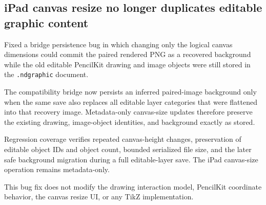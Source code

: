 \documentclass[a4paper]{article}
\title{}
\date{}
\author{Mohammad Rahmani}
\begin{document}
   \maketitle

   \begin{preview}
      \section*{iPad canvas resize no longer duplicates editable graphic content}

      Fixed a bridge persistence bug in which changing only the logical canvas
      dimensions could commit the paired rendered PNG as a recovered background
      while the old editable PencilKit drawing and image objects were still
      stored in the \texttt{.ndgraphic} document.

      The compatibility bridge now persists an inferred paired-image background
      only when the same save also replaces all editable layer categories that
      were flattened into that recovery image. Metadata-only canvas-size updates
      therefore preserve the existing drawing, image-object identities, and
      background exactly as stored.

      Regression coverage verifies repeated canvas-height changes, preservation
      of editable object IDs and object count, bounded serialized file size, and
      the later safe background migration during a full editable-layer save.
      The iPad canvas-size operation remains metadata-only.

      This bug fix does not modify the drawing interaction model, PencilKit
      coordinate behavior, the canvas resize UI, or any TikZ implementation.
   \end{preview}

   
   
\end{document}
